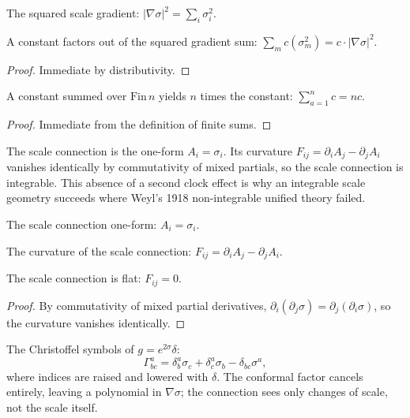 \begin{definition}
The squared scale gradient: $|\nabla\sigma|^2 = \sum_i \sigma_i^2$. 
\end{definition}

\begin{theorem}
A constant factors out of the squared gradient sum: $\sum_m c(\sigma_m^2) = c \cdot |\nabla\sigma|^2$. 
\end{theorem}

\begin{proof}
Immediate by distributivity.
\end{proof}

\begin{theorem}
A constant summed over $\text{Fin}\,n$ yields $n$ times the constant: $\sum_{a=1}^n c = nc$. 
\end{theorem}

\begin{proof}
Immediate from the definition of finite sums.
\end{proof}

The scale connection is the one-form $A_i = \sigma_i$. Its curvature $F_{ij} = \partial_i A_j - \partial_j A_i$ vanishes identically by commutativity of mixed partials, so the scale connection is integrable. This absence of a second clock effect is why an integrable scale geometry succeeds where Weyl's 1918 non-integrable unified theory failed.

\begin{definition}
The scale connection one-form: $A_i = \sigma_i$. 
\end{definition}

\begin{definition}
The curvature of the scale connection: $F_{ij} = \partial_i A_j - \partial_j A_i$. 
\end{definition}

\begin{theorem}
The scale connection is flat: $F_{ij} = 0$. 
\end{theorem}

\begin{proof}
By commutativity of mixed partial derivatives, $\partial_i(\partial_j \sigma) = \partial_j(\partial_i \sigma)$, so the curvature vanishes identically.
\end{proof}

\begin{definition}
The Christoffel symbols of $g = e^{2\sigma}\delta$:
$$\Gamma^a_{bc} = \delta^a_b \sigma_c + \delta^a_c \sigma_b - \delta_{bc}\sigma^a,$$
where indices are raised and lowered with $\delta$.  The conformal factor cancels entirely, leaving a polynomial in $\nabla\sigma$; the connection sees only changes of scale, not the scale itself. 
\end{definition}

